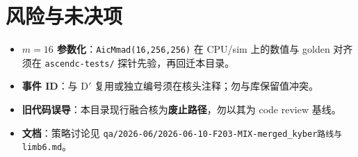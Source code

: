 \documentclass[UTF8,a4paper,11pt]{ctexart}
\begin{document}
\section{风险与未决项}
\begin{itemize}
  \item \textbf{$m{=}16$ 参数化}：\texttt{AicMmad(16,256,256)} 在 CPU/sim 上的数值与 golden 对齐须在 \texttt{ascendc-tests/} 探针先验，再回迁本目录。
  \item \textbf{事件 ID}：与 D$'$ 复用或独立编号须在核头注释；勿与库保留值冲突。
  \item \textbf{旧代码误导}：本目录现行融合核为\textbf{废止路径}，勿以其为 code review 基线。
  \item \textbf{文档}：策略讨论见 \texttt{qa/2026-06/2026-06-10-F203-MIX-merged\_kyber路线与limb6.md}。
\end{itemize}
\end{document}
